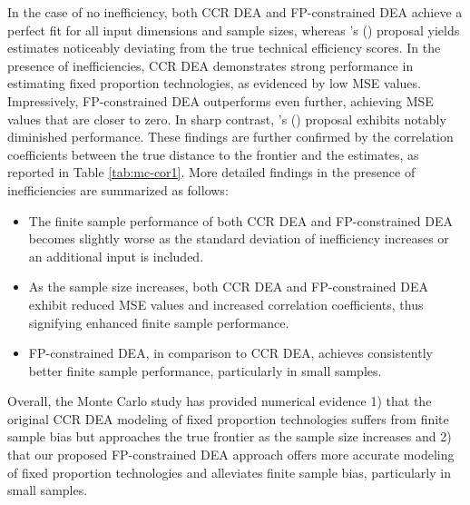 {In the case of no inefficiency, both CCR DEA and FP-constrained DEA achieve a perfect fit for all input dimensions and sample sizes, whereas \citeauthor{Barnum2011}'s (\citeyear{Barnum2011}) proposal yields estimates noticeably deviating from the true technical efficiency scores. In the presence of inefficiencies, CCR DEA demonstrates strong performance in estimating fixed proportion technologies, as evidenced by low MSE values. Impressively, FP-constrained DEA outperforms even further, achieving MSE values that are closer to zero. In sharp contrast, \citeauthor{Barnum2011}'s (\citeyear{Barnum2011}) proposal exhibits notably diminished performance. These findings are further confirmed by the correlation coefficients between the true distance to the frontier and the estimates, as reported in Table \ref{tab:mc-cor1}. More detailed findings in the presence of inefficiencies are summarized as follows:
\begin{itemize}
    \item The finite sample performance of both CCR DEA and FP-constrained DEA becomes slightly worse as the standard deviation of inefficiency increases or an additional input is included.
    \item As the sample size increases, both CCR DEA and FP-constrained DEA exhibit reduced MSE values and increased correlation coefficients, thus signifying enhanced finite sample performance.
    \item FP-constrained DEA, in comparison to CCR DEA, achieves consistently better finite sample performance, particularly in small samples. 
\end{itemize}

Overall, the Monte Carlo study has provided numerical evidence 1) that the original CCR DEA modeling of fixed proportion technologies suffers from finite sample bias but approaches the true frontier as the sample size increases and 2) that our proposed FP-constrained DEA approach offers more accurate modeling of fixed proportion technologies and alleviates finite sample bias, particularly in small samples.

}
